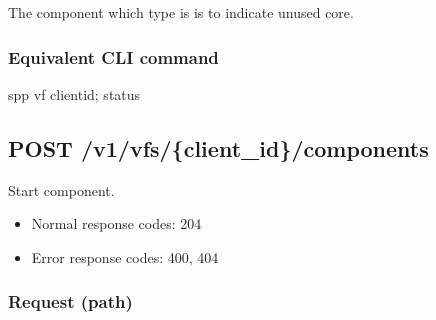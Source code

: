 \documentclass[a4paper,11pt,openany,oneside,english]{sphinxmanual}
\begin{document}
\begin{sphinxVerbatim}[commandchars=\\\{\},formatcom=\footnotesize]
                  
      \PYG{p}{]}
  \PYG{p}{]}
   \PYG{p}{[}
       
       
       
  \PYG{p}{]}
\end{sphinxVerbatim}

The component which type is  is to indicate unused core.


\subsubsection{Equivalent CLI command}
\label{\detokenize{api_ref/spp_vf:equivalent-cli-command}}
\begin{sphinxVerbatim}[commandchars=\\\{\},formatcom=\footnotesize]
spp \PYGZgt{} vf \PYGZob{}client\PYGZus{}id\PYGZcb{}; status
\end{sphinxVerbatim}


\subsection{POST /v1/vfs/\{client\_id\}/components}
\label{\detokenize{api_ref/spp_vf:post-v1-vfs-client-id-components}}
Start component.
\begin{itemize}
\item {} 
Normal response codes: 204

\item {} 
Error response codes: 400, 404

\end{itemize}


\subsubsection{Request (path)}
\label{\detokenize{api_ref/spp_vf:id1}}
\end{document}
